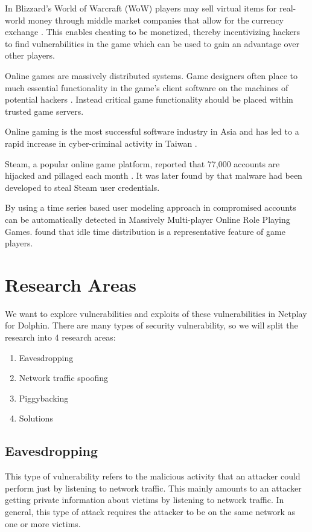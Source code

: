 \documentclass[conference]{IEEEtran}
\begin{document}
In Blizzard's World of Warcraft (WoW) players may sell virtual items for real-world money through middle market companies that allow for the currency exchange \cite{mcgraw09}. This enables cheating to be monetized, thereby incentivizing hackers to find vulnerabilities in the game which can be used to gain an advantage over other players.

Online games are massively distributed systems. Game designers often place to much essential functionality in the game's client software on the machines of potential hackers \cite{mcgraw09}. Instead critical game functionality should be placed within trusted game servers.

Online gaming is the most successful software industry in Asia and has led to a rapid increase in cyber-criminal activity in Taiwan \cite{chen04}. 

Steam, a popular online game platform, reported that 77,000 accounts are hijacked and pillaged each month \cite{steam15}. It was later found by \cite{pontiroli16} that malware had been developed to steal Steam user credentials.

By using a time series based user modeling approach in \cite{oh12} compromised accounts can be automatically detected in Massively Multi-player Online Role Playing Games. \cite{chen07} found that idle time distribution is a representative feature of game players.

\section{Research Areas}
We want to explore vulnerabilities and exploits of these vulnerabilities in Netplay for Dolphin.
There are many types of security vulnerability, so we will split the research into 4 research areas:
\vspace{0.5cm}
\begin{enumerate}  
\item Eavesdropping
\item Network traffic spoofing
\item Piggybacking
\item Solutions
\end{enumerate}
\vspace{0.5cm}

\subsection{Eavesdropping}
This type of vulnerability refers to the malicious activity that an attacker could perform just by listening to network traffic.
This mainly amounts to an attacker getting private information about victims by listening to network traffic.
In general, this type of attack requires the attacker to be on the same network as one or more victims.
\end{document}
